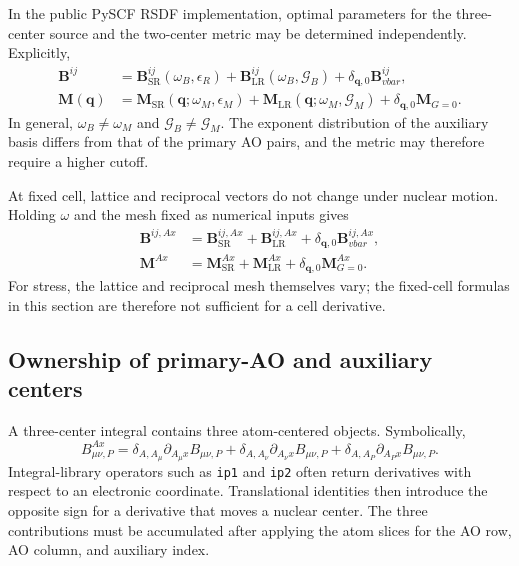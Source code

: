 In the public PySCF RSDF implementation, optimal parameters for the
three-center source and the two-center metric may be determined independently.
Explicitly,
\begin{align}
  \mathbf B^{ij}
  &=\mathbf B_{\mathrm{SR}}^{ij}(\omega_B,\epsilon_R)
  +\mathbf B_{\mathrm{LR}}^{ij}(\omega_B,\mathcal G_B)
  +\delta_{\mathbf q,0}\mathbf B_{vbar}^{ij},
  \label{eq:rsdf-source}\\
  \mathbf M(\mathbf q)
  &=\mathbf M_{\mathrm{SR}}(\mathbf q;\omega_M,\epsilon_M)
  +\mathbf M_{\mathrm{LR}}(\mathbf q;\omega_M,\mathcal G_M)
  +\delta_{\mathbf q,0}\mathbf M_{G=0}.
  \label{eq:rsdf-metric}
\end{align}
In general, $\omega_B\neq\omega_M$ and
$\mathcal G_B\neq\mathcal G_M$.  The exponent distribution of the auxiliary
basis differs from that of the primary AO pairs, and the metric may therefore
require a higher cutoff.

At fixed cell, lattice and reciprocal vectors do not change under nuclear
motion.  Holding $\omega$ and the mesh fixed as numerical inputs gives
\begin{align}
  \mathbf B^{ij,Ax}
  &=\mathbf B_{\mathrm{SR}}^{ij,Ax}
  +\mathbf B_{\mathrm{LR}}^{ij,Ax}
  +\delta_{\mathbf q,0}\mathbf B_{vbar}^{ij,Ax},\\
  \mathbf M^{Ax}
  &=\mathbf M_{\mathrm{SR}}^{Ax}
  +\mathbf M_{\mathrm{LR}}^{Ax}
  +\delta_{\mathbf q,0}\mathbf M_{G=0}^{Ax}.
\end{align}
For stress, the lattice and reciprocal mesh themselves vary; the fixed-cell
formulas in this section are therefore not sufficient for a cell derivative.

\subsection{Ownership of primary-AO and auxiliary centers}

A three-center integral contains three atom-centered objects.  Symbolically,
\begin{equation}
  B_{\mu\nu,P}^{Ax}
  =\delta_{A,A_\mu}\partial_{A_\mu x}B_{\mu\nu,P}
  +\delta_{A,A_\nu}\partial_{A_\nu x}B_{\mu\nu,P}
  +\delta_{A,A_P}\partial_{A_Px}B_{\mu\nu,P}.
\end{equation}
Integral-library operators such as \texttt{ip1} and \texttt{ip2} often return
derivatives with respect to an electronic coordinate.  Translational
identities then introduce the opposite sign for a derivative that moves a
nuclear center.  The three contributions must be accumulated after applying
the atom slices for the AO row, AO column, and auxiliary index.

